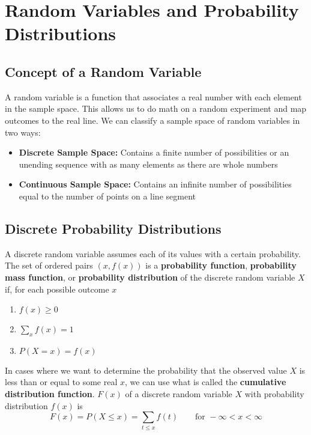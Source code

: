 \documentclass[11pt]{article}
\begin{document}
\pagebreak

\section{Random Variables and Probability Distributions}

\subsection{Concept of a Random Variable}
A random variable is a function that associates a real number with each element in the sample space. This allows us to do math on a random experiment and map outcomes to the real line. We can classify a sample space of random variables in two ways:
\begin{itemize}
\item \textbf{Discrete Sample Space:}  Contains a finite number of possibilities or an unending sequence with as many elements as there are whole numbers
\item \textbf{Continuous Sample Space:} Contains an infinite number of possibilities equal to the number of points on a line segment
\end{itemize}

\subsection{Discrete Probability Distributions}
A discrete random variable assumes each of its values with a certain probability. The set of ordered pairs $(x, f (x))$ is a \textbf{probability function}, \textbf{probability mass function}, or \textbf{probability distribution} of the discrete random variable $X$ if, for each possible outcome $x$
\begin{enumerate}
\item $f(x) \geq 0$
\item $\sum_x  f(x) = 1$
\item $P(X=x) = f(x)$
\end{enumerate}
In cases where we want to determine the probability that the observed value $X$ is less than or equal to some real $x$, we can use what is called the \textbf{cumulative distribution function}. $F(x)$ of a discrete random variable $X$ with probability distribution $f(x)$ is 
$$ F(x) = P(X \leq x) = \sum_{t \leq x} f(t) \quad \quad \text{for } -\infty < x < \infty $$
\end{document}
